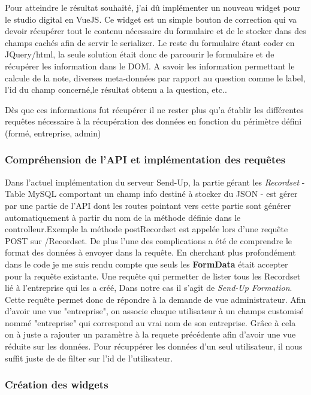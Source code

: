 Pour atteindre le résultat souhaité, j'ai dû implémenter un nouveau widget pour le studio digital en VueJS. Ce widget est un simple bouton de correction qui va devoir récupérer tout le contenu nécessaire du formulaire et de le stocker dans des champs cachés afin de servir le serializer. Le reste du formulaire étant coder en JQuery/html, la seule solution était donc de parcourir le formulaire et de récupérer les information dans le DOM. A savoir les information permettant le calcule de la note, diverses meta-données par rapport au question comme le label, l'id du champ concerné,le résultat obtenu a la question, etc.. 

Dès que ces informations fut récupérer il ne rester plus qu'a établir les différentes requêtes nécessaire à la récupération des données en fonction du périmètre défini (formé, entreprise, admin)


\subsubsection{Compréhension de l'API et implémentation des requêtes}

Dans l'actuel implémentation du serveur Send-Up, la partie gérant les \textit{Recordset} - Table MySQL comportant un champ info destiné à stocker du JSON - est gérer par une partie de l'API dont les routes pointant vers cette partie sont générer automatiquement à partir du nom de la méthode définie dans le controlleur.Exemple la méthode postRecordset est appelée lors d'une requête POST sur /Recordset. De plus l'une des complications a été de comprendre le format des données à envoyer dans la requête. En cherchant plus profondément dans le code je me suis rendu compte que seuls les \textbf{FormData} était accepter pour la requête existante.
Une requête qui permetter de lister tous les Recordset lié à l'entreprise qui les a créé, Dans notre cas il s'agit de \textit{Send-Up Formation}. Cette requête permet donc de répondre à la demande de vue administrateur. Afin d'avoir une vue "entreprise", on associe chaque utilisateur à  un champs customisé nommé "entreprise" qui correspond au vrai nom de son entreprise. Grâce à cela on à juste a rajouter un paramètre à la requete précédente afin d'avoir une vue réduite sur les données. 
Pour récuppérer les données d'un seul utilisateur, il nous suffit juste de de filter sur l'id de l'utilisateur.   

\subsubsection{Création des widgets}


